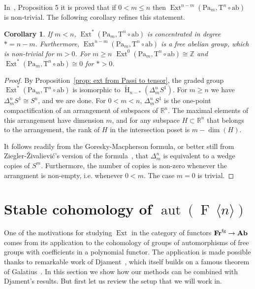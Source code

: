 \documentclass[psamsfonts]{amsart}
\theoremstyle{plain}
\newtheorem{cor}[thm]{Corollary}
\theoremstyle{definition}
\theoremstyle{remark}
\newcommand{\Z}{\mathbb{Z}}
\newcommand{\R}{\mathbb{R}}
\newcommand{\catname}[1]{{\normalfont\textbf{#1}}}
\newcommand{\fr}{\allfr^{\mathrm{fg}}}
\newcommand{\allfr}{\catname{Fr}}
\newcommand{\ab}{\catname{Ab}}
\newcommand{\aut}{\operatorname{aut}}
\newcommand{\free}[1]{\operatorname{F}\,\langle #1\rangle}
\newcommand{\HH}{\operatorname{H}} %
\newcommand{\abelianization}{\mathrm{ab}}
\newcommand{\tensor}{\mathrm{T}}
\newcommand{\Passi}{\mathrm{Pa}}
\DeclareMathOperator{\ext}{Ext}
\begin{document}
In~\cite{Vespa2018}, Proposition 5 it is proved that if $0< m\le n$ then $\ext^{n-m}(\Passi_m, \tensor^n\circ\abelianization)$ is non-trivial. The following corollary refines this statement.
\begin{cor}\label{cor: ext from Passi to tensor}   
If $m< n$, $\ext^*(\Passi_m, \tensor^n\circ \abelianization)$ is concentrated in degree $*=n-m$. Furthermore, $\ext^{n-m}(\Passi_m, \tensor^n\circ \abelianization)$ is a free abelian group, which is non-trivial for $m>0$. For $m\ge n$ $\ext^0(\Passi_m, \tensor^n\circ \abelianization)\cong\Z$ and $\ext^*(\Passi_m, \tensor^n\circ \abelianization)\cong0$ for $*>0$.
\end{cor}
\begin{proof}
By Proposition~\ref{prop: ext from Passi to tensor}, the graded group $\ext^*(\Passi_m, \tensor^n\circ \abelianization)$ is isomorphic to $\widetilde{\HH}_{n-*}(\Delta^n_mS^1)$. For $m\ge n$ we have $\Delta^n_mS^1\cong S^n$, and we are done. For $0<m<n$,  $\Delta^n_mS^1$ is the one-point compactification of an arrangement of subspaces of $\R^n$. The maximal elements of this arrangement have dimension $m$, and for any subspace $H\subset \R^n$ that belongs to the arrangement, the rank of $H$ in the intersection poset is $m-\dim(H)$.

It follows readily from the Goresky-Macpherson formula, or better still from Ziegler-{\v Z}ivalievi{\'c}'s version of the formula~\cite[Theorem 2.2]{ZigZiv}, that $\Delta^n_m$ is equivalent to a wedge copies of $S^m$. Furthermore, the number of copies is non-zero whenever the arrangment is non-empty, i.e. whenever $0<m$. The case $m=0$ is trivial.
\end{proof}
\section{Stable cohomology of $\aut(\free{n})$}\label{section:stable cohomology}
One of the motivations for studying $\ext$ in the category of functors $\fr\to \ab$ comes from its application to the cohomology of groups of automorphisms of free groups with coefficients in a polynomial functor. The application is made possible thanks to remarkable work of Djament~\cite{Djament2019}, which itself builds on a famous theorem of Galatius~\cite{Galatius}. In this section we show how our methods can be combined with Djament's results. But first let us review the setup that we will work in.
\end{document}
